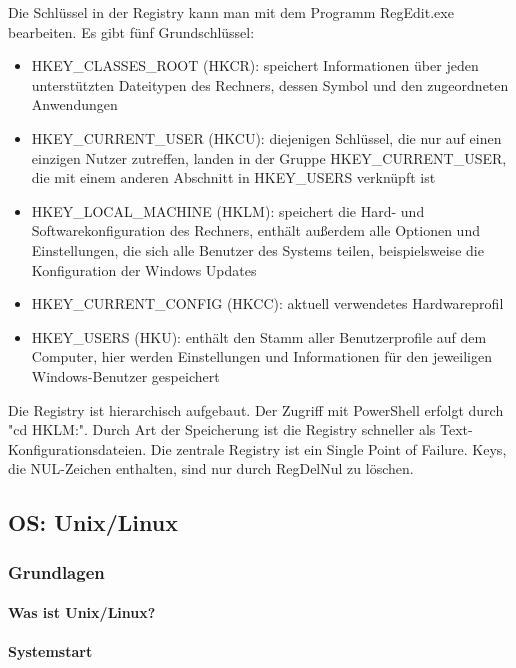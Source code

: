 Die Schlüssel in der Registry kann man mit dem Programm RegEdit.exe bearbeiten. Es gibt fünf Grundschlüssel:
\begin{itemize}
	\item HKEY\_CLASSES\_ROOT (HKCR): speichert Informationen über jeden unterstützten Dateitypen des Rechners, dessen Symbol und den zugeordneten Anwendungen
	\item HKEY\_CURRENT\_USER (HKCU): diejenigen Schlüssel, die nur auf einen einzigen Nutzer zutreffen, landen in der Gruppe HKEY\_CURRENT\_USER, die mit einem anderen Abschnitt in HKEY\_USERS verknüpft ist
	\item HKEY\_LOCAL\_MACHINE (HKLM): speichert die Hard- und Softwarekonfiguration des Rechners, enthält außerdem alle Optionen und Einstellungen, die sich alle Benutzer des Systems teilen, beispielsweise die Konfiguration der Windows Updates
	\item HKEY\_CURRENT\_CONFIG (HKCC): aktuell verwendetes Hardwareprofil
	\item HKEY\_USERS (HKU): enthält den Stamm aller Benutzerprofile auf dem Computer, hier werden Einstellungen und Informationen für den jeweiligen Windows-Benutzer gespeichert
\end{itemize}

Die Registry ist hierarchisch aufgebaut. Der Zugriff mit PowerShell erfolgt durch "cd HKLM:". Durch Art der Speicherung ist die Registry schneller als Text-Konfigurationsdateien. Die zentrale Registry ist ein Single Point of Failure. Keys, die NUL-Zeichen enthalten, sind nur durch RegDelNul zu löschen.


\subsection{OS: Unix/Linux}

\subsubsection{Grundlagen}

\paragraph{Was ist Unix/Linux?}

\paragraph{Systemstart}

